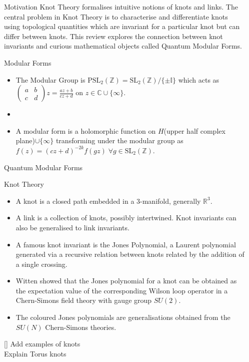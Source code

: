 \documentclass[final,10pt]{beamer}
\newlength{\sepwidth}
\newlength{\colwidth}
\newcommand{\separatorcolumn}{\begin{column}{\sepwidth}\end{column}}
\newcommand{\R}{\mathbb{R}}
\newcommand{\C}{\mathbb{C}}
\newcommand{\Z}{\mathbb{Z}}
\newcommand{\I}{\mathbb{I}}
\begin{document}
\begin{frame}[t]
\begin{columns}[t]
\separatorcolumn

\begin{column}{\colwidth}


\begin{block}{Motivation}
Knot Theory formalises intuitive notions of knots and links. The central problem in Knot Theory is to characterise and differentiate knots using topological quantities which are invariant for a particular knot but can differ between knots. This review explores the connection between knot invariants and curious mathematical objects called Quantum Modular Forms.
\end{block}


\begin{block}{Modular Forms}
\begin{itemize}
    \item The Modular Group is $\text{PSL}_2(\Z)=\text{SL}_2(\Z)/\{\pm \I\}$ which acts as $\left(\!\begin{smallmatrix}a&b\\c&d\end{smallmatrix}\!\right) z = \frac{az+b}{cz+d}$ on $z\in\C\cup\{\infty\}$.
    \item 
    \item A modular form is a holomorphic function on $H$(upper half complex plane)$\cup\{\infty\}$ transforming under the modular group as $f(z)=(cz+d)^{-2k}f(gz)\; \forall g\in\mathrm{SL}_2(\Z)$.
\end{itemize}
\end{block}


\begin{block}{Quantum Modular Forms}
\end{block}



\begin{block}{Knot Theory}
\begin{itemize}
    \item A knot is a closed path embedded in a 3-manifold, generally $\R^3$.
    \item A link is a collection of knots, possibly intertwined. Knot invariants can also be generalised to link invariants.
    \item A famous knot invariant is the Jones Polynomial, a Laurent polynomial generated via a recursive relation between knots related by the addition of a single crossing.
    \item Witten showed that the Jones polynomial for a knot can be obtained as the expectation value of the corresponding Wilson loop operator in a Chern-Simons field theory with gauge group $SU(2)$.
    \item The coloured Jones polynomials are generalisations obtained from the $SU(N)$ Chern-Simons theories.
\end{itemize}
[] Add examples of knots\\
[] Explain Torus knots
\end{block}


\end{column}
\end{columns}
\end{frame}
\end{document}

